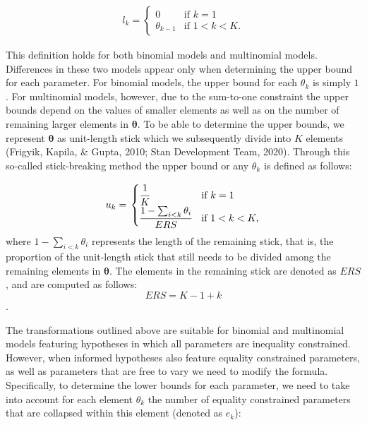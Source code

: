 \begin{appendix}
\begin{align*}
  l_k = \left.
  \begin{cases}
      0 & \text{if } k = 1 \\
      \theta_{k - 1} & \text{if } 1 < k < K.
  \end{cases}
    \right.
\end{align*}

This definition holds for both binomial models and multinomial models.
Differences in these two models appear only when determining the upper
bound for each parameter. For binomial models, the upper bound for each
\(\theta_k\) is simply \(1\). For multinomial models, however, due to
the sum-to-one constraint the upper bounds depend on the values of
smaller elements as well as on the number of remaining larger elements
in \(\boldsymbol{\theta}\). To be able to determine the upper bounds, we
represent \(\boldsymbol{\theta}\) as unit-length stick which we
subsequently divide into \(K\) elements (Frigyik, Kapila, \& Gupta,
2010; Stan Development Team, 2020). Through this so-called
stick-breaking method the upper bound or any \(\theta_k\) is defined as
follows:

\begin{align}
\label{Eq:upperBound}
  u_k = \left.
  \begin{cases}
      \cfrac{1}{K} & \text{if } k = 1 \\
      \cfrac{1 - \sum_{i < k} \theta_i}{ERS} & \text{if } 1 < k < K,
  \end{cases}
    \right.
\end{align} where \(1 - \sum_{i < k} \theta_i\) represents the length of
the remaining stick, that is, the proportion of the unit-length stick
that still needs to be divided among the remaining elements in
\(\boldsymbol{\theta}\). The elements in the remaining stick are denoted
as \(ERS\), and are computed as follows: \[ERS = K - 1 + k\].

The transformations outlined above are suitable for binomial and
multinomial models featuring hypotheses in which all parameters are
inequality constrained. However, when informed hypotheses also feature
equality constrained parameters, as well as parameters that are free to
vary we need to modify the formula. Specifically, to determine the lower
bounds for each parameter, we need to take into account for each element
\(\theta_k\) the number of equality constrained parameters that are
collapsed within this element (denoted as \(e_k\)):


\end{appendix}
